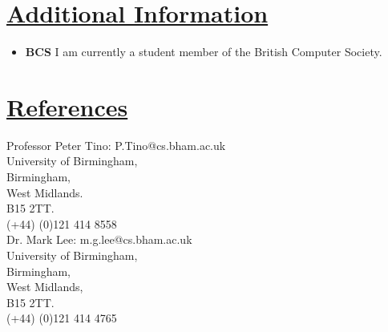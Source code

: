 \documentclass[11pt]{article}
\begin{document}
	\vspace{-20pt}
	\hspace{-100pt}\section*{\underline{Additional Information}}
		\begin{itemize}
			\item \textbf{BCS} I am currently a student member of the British Computer Society.
		\end{itemize}

				
	\vspace{-20pt}
	\hspace{-100pt}\section*{\underline{References}}	
				\begin{multicols}{2}
					\noindent
					Professor Peter Tino:  P.Tino@cs.bham.ac.uk  \\
					University of Birmingham,\\
					Birmingham, \\
					West Midlands.\\
					B15 2TT.\\
					(+44) (0)121 414 8558\\
	
					\noindent
					Dr. Mark Lee: m.g.lee@cs.bham.ac.uk\\
					University of Birmingham,\\
					Birmingham,\\
					West Midlands,\\
					B15 2TT.\\
					(+44) (0)121 414 4765\\
				\end{multicols}
\end{document}
